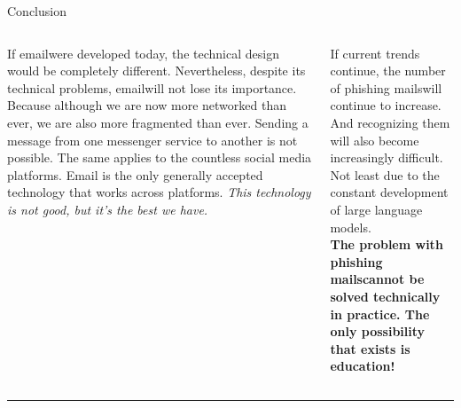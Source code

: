 \documentclass[compress,dvipsnames]{beamer}
\newcommand{\mainRuleThickness}{4pt}
\newcommand{\blockTitleSize}{\huge}
\newcommand{\Em}{email} %
\newcommand{\phms}{phishing mails}
\begin{document}
\vspace{-3cm}

\begin{block}{\centering \blockTitleSize Conclusion}
    \begin{columns}[T]
        \begin{column}{0.485\textwidth}
            \begin{minipage}[t][0.075\textheight][t]{\textwidth}
                \large
                If \Em\space were developed today, the technical design would be completely different. Nevertheless, despite its technical problems, \Em\space will not lose its importance. Because although we are now more networked than ever, we are also more fragmented than ever. Sending a message from one messenger service to another is not possible. The same applies to the countless social media platforms. Email is the only generally accepted technology that works across platforms. \emph{This technology is not good, but it's the best we have.}
            \end{minipage}
        \end{column}

        \begin{column}{0.485\textwidth}
            \begin{minipage}[t][0.075\textheight][t]{\textwidth}
                \large
                If current trends continue, the number of \phms\space will continue to increase. And recognizing them will also become increasingly difficult. Not least due to the constant development of large language models.\\

                \large
                \textbf{The problem with \phms\space cannot be solved technically in practice. The only possibility that exists is education!}
            \end{minipage}
        \end{column}
    \end{columns}
\end{block}

\rule[0cm]{\textwidth}{\mainRuleThickness}
\end{document}
